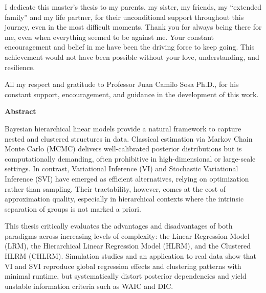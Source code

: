     \begin{flushright}
    \begin{minipage}{8cm}
        \noindent
            \small
           I dedicate this master's thesis to my parents, my sister, my friends, my “extended family” and my life partner, for their unconditional support throughout this journey, even in the most difficult moments. Thank you for always being there for me, even when everything seemed to be against me. Your constant encouragement and belief in me have been the driving force to keep going. This achievement would not have been possible without your love, understanding, and resilience.\\
    \end{minipage}
    \end{flushright}

\vspace{5cm}

    All my respect and gratitude to Professor Juan Camilo Sosa Ph.D., for his constant support, encouragement, and guidance in the development of this work.\\


\newpage
{}
\textbf{\LARGE Abstract}

Bayesian hierarchical linear models provide a natural framework to capture nested and clustered structures in data. Classical estimation via Markov Chain Monte Carlo (MCMC) delivers well-calibrated posterior distributions but is computationally demanding, often prohibitive in high-dimensional or large-scale settings. In contrast, Variational Inference (VI) and Stochastic Variational Inference (SVI) have emerged as efficient alternatives, relying on optimization rather than sampling. Their tractability, however, comes at the cost of approximation quality, especially in hierarchical contexts where the intrinsic separation of groups is not marked a priori.   

\vspace{0.5 cm}

This thesis critically evaluates the advantages and disadvantages of both paradigms across increasing levels of complexity: the Linear Regression Model (LRM), the Hierarchical Linear Regression Model (HLRM), and the Clustered HLRM (CHLRM). Simulation studies and an application to real data show that VI and SVI reproduce global regression effects and clustering patterns with minimal runtime, but systematically distort posterior dependencies and yield unstable information criteria such as WAIC and DIC.  

